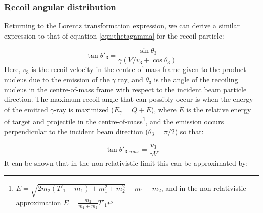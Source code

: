 \subsubsection{Recoil angular distribution}

Returning to the Lorentz transformation expression, we can derive a similar expression to that of equation \ref{eqn:thetagamma} for the recoil particle:

\begin{equation}
\tan{\theta'_{3}} = \frac{\sin{\theta_{3}}}{\gamma(V/v_{3}+\cos{\theta_{3}})}
\end{equation}
%
Here, $v_{3}$ is the recoil velocity in the centre-of-mass frame given to the product nucleus due to the emission of the $\gamma$ ray, and $\theta_{3}$ is the angle of the recoiling nucleus in the centre-of-mass frame with respect to the incident beam particle direction. The maximum recoil angle that can possibly occur is when the energy of the emitted $\gamma$-ray is maximized ($E_{\gamma}=Q+E$), where $E$ is the relative energy of target and projectile in the centre-of-mass\footnote{ $E=\sqrt{2m_{2}(T'_{1}+m_{1})+m_{1}^{2}+m_{2}^{2}}-m_{1}-m_{2}$, and in the non-relativistic approximation $E=\frac{m_{2}}{m_{1}+m_{2}}T'_{1}$ }, and the emission occurs perpendicular to the incident beam direction ($\theta_{3}=\pi/2$) so that:

\begin{equation}
\tan{\theta'_{3,max}}=\frac{v_{3}}{\gamma V}
\end{equation} 
%
It can be shown that in the non-relativistic limit this can be approximated by:

